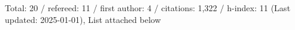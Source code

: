 Total: 20 / refereed: 11 / first author: 4 / citations: 1,322 / h-index: 11 (Last updated: 2025-01-01), List attached below